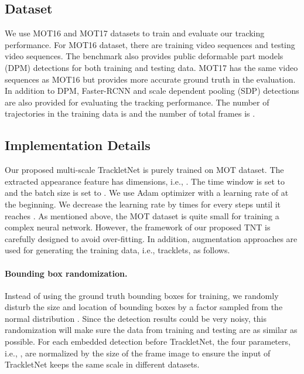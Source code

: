 \documentclass[10pt,twocolumn,letterpaper]{article}
\begin{document}
\subsection{Dataset}
\label{sec:dataset}
We use MOT16 and MOT17 \cite{milan2016mot16} datasets to train and evaluate our tracking performance. For MOT16 dataset, there are  training video sequences and  testing video sequences. The benchmark also provides public deformable part models (DPM) \cite{felzenszwalb2010object} detections for both training and testing data. MOT17 has the same video sequences 
as MOT16 but provides more accurate ground truth in the evaluation. In addition to DPM, Faster-RCNN \cite{ren2015faster} and scale dependent pooling (SDP) \cite{yang2016exploit} detections are also provided for evaluating the tracking performance. The number of trajectories in the training data is  and the number of total frames is .

\subsection{Implementation Details}



Our proposed multi-scale TrackletNet is purely trained on MOT dataset. The extracted appearance feature has  dimensions, i.e., . The time window  is set to  and the batch size  is set to . We use Adam optimizer with a learning rate of  at the beginning. We decrease the learning rate by  times for every  steps until it reaches . As mentioned above, the MOT dataset is quite small for training a complex neural network. However, the framework of our proposed TNT is carefully designed to avoid over-fitting. In addition, augmentation approaches are used for generating the training data, i.e., tracklets, as follows. 



\paragraph{Bounding box randomization.} Instead of using the ground truth bounding boxes for training, we randomly disturb the size and location of bounding boxes 
by a factor  sampled from the normal distribution . Since the detection results could be very noisy, this randomization will make sure the data from training and testing are as similar as possible. For each embedded detection before TrackletNet, the four parameters, i.e., , are normalized by the size of the frame image to ensure the input of TrackletNet keeps the same scale in different datasets.
\end{document}
